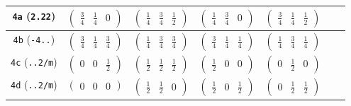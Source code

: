 \documentclass[fleqn,9pt,landscape]{jsarticle}
\begin{document}
\begin{center}
\begin{longtable}{ccccccc}
{\tt 4a} ({\tt 2.22}) & $ \begin{pmatrix} \frac{3}{4} & \frac{1}{4} & 0 \end{pmatrix} $ & $ \begin{pmatrix} \frac{1}{4} & \frac{3}{4} & \frac{1}{2} \end{pmatrix} $ & $ \begin{pmatrix} \frac{1}{4} & \frac{3}{4} & 0 \end{pmatrix} $ & $ \begin{pmatrix} \frac{3}{4} & \frac{1}{4} & \frac{1}{2} \end{pmatrix} $ & $  $ & $  $ \\ \hline
{\tt 4b} ({\tt -4..}) & $ \begin{pmatrix} \frac{3}{4} & \frac{1}{4} & \frac{3}{4} \end{pmatrix} $ & $ \begin{pmatrix} \frac{1}{4} & \frac{3}{4} & \frac{3}{4} \end{pmatrix} $ & $ \begin{pmatrix} \frac{3}{4} & \frac{1}{4} & \frac{1}{4} \end{pmatrix} $ & $ \begin{pmatrix} \frac{1}{4} & \frac{3}{4} & \frac{1}{4} \end{pmatrix} $ & $  $ & $  $ \\ \hline
{\tt 4c} ({\tt ..2/m}) & $ \begin{pmatrix} 0 & 0 & \frac{1}{2} \end{pmatrix} $ & $ \begin{pmatrix} \frac{1}{2} & \frac{1}{2} & \frac{1}{2} \end{pmatrix} $ & $ \begin{pmatrix} \frac{1}{2} & 0 & 0 \end{pmatrix} $ & $ \begin{pmatrix} 0 & \frac{1}{2} & 0 \end{pmatrix} $ & $  $ & $  $ \\ \hline
{\tt 4d} ({\tt ..2/m}) & $ \begin{pmatrix} 0 & 0 & 0 \end{pmatrix} $ & $ \begin{pmatrix} \frac{1}{2} & \frac{1}{2} & 0 \end{pmatrix} $ & $ \begin{pmatrix} \frac{1}{2} & 0 & \frac{1}{2} \end{pmatrix} $ & $ \begin{pmatrix} 0 & \frac{1}{2} & \frac{1}{2} \end{pmatrix} $ & $  $ & $  $ \\ \hline

\end{longtable}
\end{center}
\end{document}
